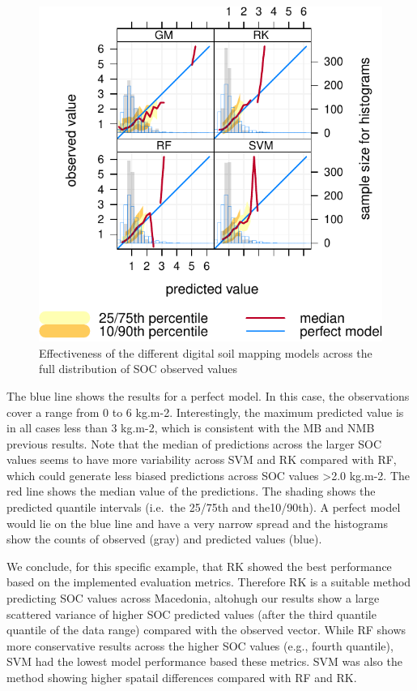 \documentclass[10pt,b5paper,]{book}
\theoremstyle{definition}
\theoremstyle{definition}
\theoremstyle{definition}
\theoremstyle{remark}
\begin{document}
\begin{figure}
\centering
\includegraphics{SOCMapping_files/figure-latex/condquant-1.pdf}
\caption{\label{fig:condquant}Effectiveness of the different digital soil
mapping models across the full distribution of SOC observed values}
\end{figure}

The blue line shows the results for a perfect model. In this case, the
observations cover a range from 0 to 6 kg.m-2. Interestingly, the
maximum predicted value is in all cases less than 3 kg.m-2, which is
consistent with the MB and NMB previous results. Note that the median of
predictions across the larger SOC values seems to have more variability
across SVM and RK compared with RF, which could generate less biased
predictions across SOC values \textgreater{}2.0 kg.m-2. The red line
shows the median value of the predictions. The shading shows the
predicted quantile intervals (i.e.~the 25/75th and the10/90th). A
perfect model would lie on the blue line and have a very narrow spread
and the histograms show the counts of observed (gray) and predicted
values (blue).

We conclude, for this specific example, that RK showed the best
performance based on the implemented evaluation metrics. Therefore RK is
a suitable method predicting SOC values across Macedonia, altohugh our
results show a large scattered variance of higher SOC predicted values
(after the third quantile quantile of the data range) compared with the
observed vector. While RF shows more conservative results across the
higher SOC values (e.g., fourth quantile), SVM had the lowest model
performance based these metrics. SVM was also the method showing higher
spatail differences compared with RF and RK.
\end{document}
